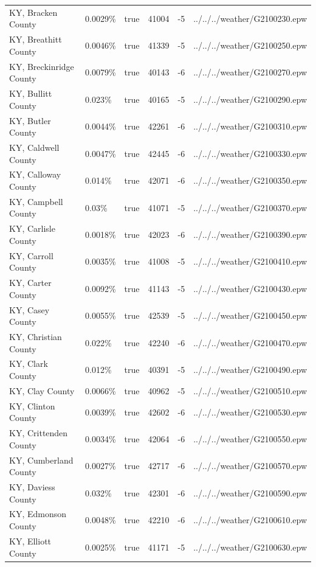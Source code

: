 \begin{longtable}[]{@{}llllll@{}}
KY, Bracken County & 0.0029\% & true & 41004 & -5 &
../../../weather/G2100230.epw \\
KY, Breathitt County & 0.0046\% & true & 41339 & -5 &
../../../weather/G2100250.epw \\
KY, Breckinridge County & 0.0079\% & true & 40143 & -6 &
../../../weather/G2100270.epw \\
KY, Bullitt County & 0.023\% & true & 40165 & -5 &
../../../weather/G2100290.epw \\
KY, Butler County & 0.0044\% & true & 42261 & -6 &
../../../weather/G2100310.epw \\
KY, Caldwell County & 0.0047\% & true & 42445 & -6 &
../../../weather/G2100330.epw \\
KY, Calloway County & 0.014\% & true & 42071 & -6 &
../../../weather/G2100350.epw \\
KY, Campbell County & 0.03\% & true & 41071 & -5 &
../../../weather/G2100370.epw \\
KY, Carlisle County & 0.0018\% & true & 42023 & -6 &
../../../weather/G2100390.epw \\
KY, Carroll County & 0.0035\% & true & 41008 & -5 &
../../../weather/G2100410.epw \\
KY, Carter County & 0.0092\% & true & 41143 & -5 &
../../../weather/G2100430.epw \\
KY, Casey County & 0.0055\% & true & 42539 & -5 &
../../../weather/G2100450.epw \\
KY, Christian County & 0.022\% & true & 42240 & -6 &
../../../weather/G2100470.epw \\
KY, Clark County & 0.012\% & true & 40391 & -5 &
../../../weather/G2100490.epw \\
KY, Clay County & 0.0066\% & true & 40962 & -5 &
../../../weather/G2100510.epw \\
KY, Clinton County & 0.0039\% & true & 42602 & -6 &
../../../weather/G2100530.epw \\
KY, Crittenden County & 0.0034\% & true & 42064 & -6 &
../../../weather/G2100550.epw \\
KY, Cumberland County & 0.0027\% & true & 42717 & -6 &
../../../weather/G2100570.epw \\
KY, Daviess County & 0.032\% & true & 42301 & -6 &
../../../weather/G2100590.epw \\
KY, Edmonson County & 0.0048\% & true & 42210 & -6 &
../../../weather/G2100610.epw \\
KY, Elliott County & 0.0025\% & true & 41171 & -5 &
../../../weather/G2100630.epw \\

\end{longtable}
